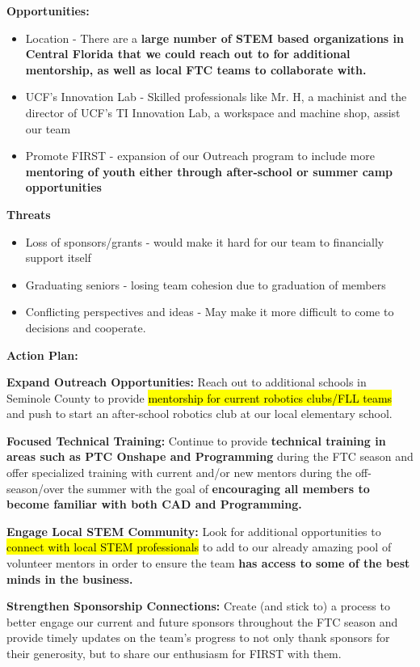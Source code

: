 \textbf{Opportunities:} 
\begin{itemize}
\item Location - There are a \textbf{large number of STEM based organizations in Central Florida that we could reach out to for additional mentorship, as well as local FTC teams to collaborate with.}
\item UCF’s Innovation Lab - Skilled professionals like Mr. H, a machinist and the director of UCF’s TI Innovation Lab, a workspace and machine shop, assist our team
\item Promote FIRST - expansion of our Outreach program to include more \textbf{mentoring of youth either through after-school or summer camp opportunities}
\end{itemize}

  \textbf{Threats}
\begin{itemize}
 \item Loss of sponsors/grants - would make it hard for our team to financially support itself
 \item Graduating seniors - losing team cohesion due to graduation of members
 \item Conflicting perspectives and ideas - May make it more difficult to come to decisions and cooperate.
\end{itemize}

\textbf{\Large Action Plan:}

\textbf{Expand Outreach Opportunities:} Reach out to additional schools in Seminole County to provide \hl{mentorship for current robotics clubs/FLL teams} and push to start an after-school robotics club at our local elementary school.

\textbf{Focused Technical Training:} Continue to provide \textbf{technical training in areas such as PTC Onshape and Programming} during the FTC season and offer specialized training with current and/or new mentors during the off-season/over the summer with the goal of \textbf{encouraging all members to become familiar with both CAD and Programming.}

\textbf{Engage Local STEM Community:} Look for additional opportunities to \hl{connect with local STEM professionals} to add to our already amazing pool of volunteer mentors in order to ensure the team \textbf{has access to some of the best minds in the business.}

\textbf{Strengthen Sponsorship Connections:} Create (and stick to) a process to better engage our current and future sponsors throughout the FTC season and provide timely updates on the team’s progress to not only thank sponsors for their generosity, but to share our enthusiasm for FIRST with them.

